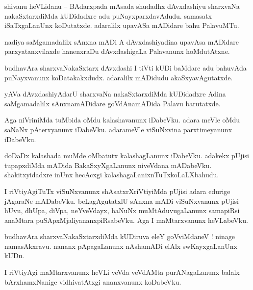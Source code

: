 \documentclass{article}
\begin{document}
\begin{mn}%
shivanu heVLidanu -- BAdarxpada mAsada shudadhx dAvxdashiyu sharxvaNa nakaSxtarxdiMda kUDidadxre 
adu puNayxparxdavAdudu. samasatx iSaTxgaLanUnx koDutatxde. adaralilx upavASa mADidare bahu 
PalavuMTu.
\end{mn}

\begin{mn}%
nadiya saMgamadalilx sAnxna mADi A dAvxdashiyadina upavAsa mADidare parxyatanxvilaxde hanenxraDu 
dAvxdashigaLa Palavanunx hoMdutAtxne.
\end{mn}

\begin{mn}%
budhavAra sharxvaNakaSxtarx dAvxdashi I tiVti kUDi baMdare adu bahuvAda puNayxvanunx 
koDatakakxdudx. adaralilx mADidudu akaSxyavAgutatxde.
\end{mn}

\begin{mn}%
yAVa dAvxdashiyAdarU sharxvaNa nakaSxtarxdiMda kUDidadxre Adina saMgamadalilx sAnxnamADidare 
goVdAnamADida Palavu barutatxde.
\end{mn}

\begin{mn}%
Aga niVriniMda tuMbida oMdu kalashavanunx iDabeVku. adara meVle oMdu saNaNx pAterxyanunx iDabeVku. 
adarameVle viSuNxvina parxtimeyanunx iDabeVku.
\end{mn}

\begin{mn}%
doDaDx kalashada muMde oMbatutx kalashagLanunx iDabeVku. adakekx pUjisi tupapxdiMda mADida 
BakaSxyXgaLanunx niveVdana mADabeVku. shakitxyidadxre inUnx hecAcxgi 
kalashagaLanixnTuTxkoLaLXbahudu.
\end{mn}

\begin{mn}%
I riVtiyAgiTuTx viSuNxvanunx shAsatxrXriVtiyiMda pUjisi adara edurige jAgaraNe mADabeVku. 
beLagAgutatxlU sAnxna mADi viSuNxvanunx pUjisi hUvu, dhUpa, diVpa, neYveVdayx, haNuNx 
muMtAduvugaLanunx samapiRsi anaMtara puSApxMjaliyananxpiRsabeVku. Aga I maMtarxvanunx heVLabeVku.
\end{mn}

\begin{mn}%
budhavAra sharxvaNakaSxtarxdiMda kUDiruva eleY goVviMdaneV ! ninage namasAkxravu. nananx 
pApagaLanunx nAshamADi elAlx swKayxgaLanUnx kUDu.
\end{mn}

\begin{mn}%
I riVtiyAgi maMtarxvanunx heVLi veVda veVdAMta purANagaLanunx balalx bArxhamxNanige vidhivatAtxgi 
ananxvanunx koDabeVku.
\end{mn}
\end{document}
